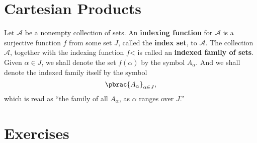 \section{Cartesian Products}

\begin{definition}
  Let $\mathcal{A}$ be a nonempty collection of sets. An \textbf{indexing
  function} for $\mathcal{A}$ is a surjective function $f$ from some set $J$,
  called the \textbf{index set}, to $\mathcal{A}$. The collection $\mathcal{A}$, together with the indexing function $f$< is called an \textbf{indexed family of sets}. Given $\alpha \in J$, we shall denote the set $f(\alpha)$ by the symbol $A_\alpha$. And we shall denote the indexed family itself by the symbol
  \begin{equation}
    \pbrac{
      A_\alpha
    }_{
      \alpha \in J
    },
  \end{equation}
  which is read as ``the family of all $A_\alpha$, as $\alpha$ ranges over $J$.''
\end{definition}

\section*{Exercises}



